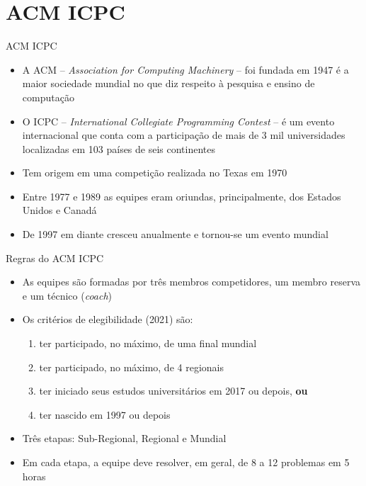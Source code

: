 \section{ACM ICPC}

\begin{frame}[fragile]{ACM ICPC}

    \begin{itemize}
        \item A ACM -- \textit{Association for Computing Machinery} -- foi fundada em 1947 é 
        a maior sociedade mundial no que diz respeito à pesquisa e ensino de computação
        \item O ICPC -- \textit{International Collegiate Programming Contest} -- é um evento
        internacional que conta com a participação de mais de 3 mil universidades localizadas em
        103 países de seis continentes
        \item Tem origem em uma competição realizada no Texas em 1970
        \item Entre 1977 e 1989 as equipes eram oriundas, principalmente, dos Estados Unidos e Canadá
        \item De 1997 em diante cresceu anualmente e tornou-se um evento mundial
    \end{itemize}

\end{frame}

\begin{frame}[fragile]{Regras do ACM ICPC}

    \begin{itemize}
        \item As equipes são formadas por três membros competidores, um membro reserva e um 
        técnico (\textit{coach})
        \item Os critérios de elegibilidade (2021) são:
            \begin{enumerate}
                \item ter participado, no máximo, de uma final mundial
                \item ter participado, no máximo, de 4 regionais
                \item ter iniciado seus estudos universitários em 2017 ou depois, \textbf{ou} 
                \item ter nascido em 1997 ou depois
            \end{enumerate}
        \item Três etapas: Sub-Regional, Regional e Mundial
        \item Em cada etapa, a equipe deve resolver, em geral, de 8 a 12 problemas em 5 horas
    \end{itemize}

\end{frame}

